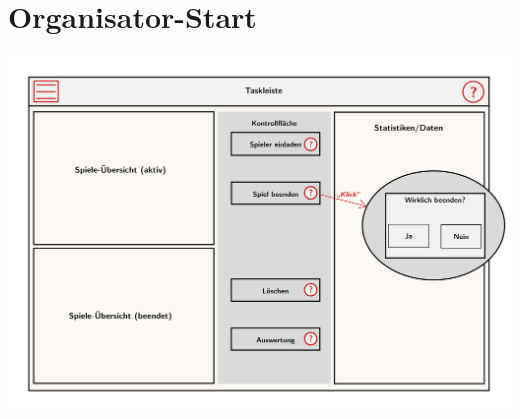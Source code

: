 \documentclass[a4paper]{scrreprt}
\begin{document}
    \section{Organisator-Start}
    \centering
    \includegraphics[width=\textwidth]{../pictures/2_Organisator.jpg}
\end{document}
